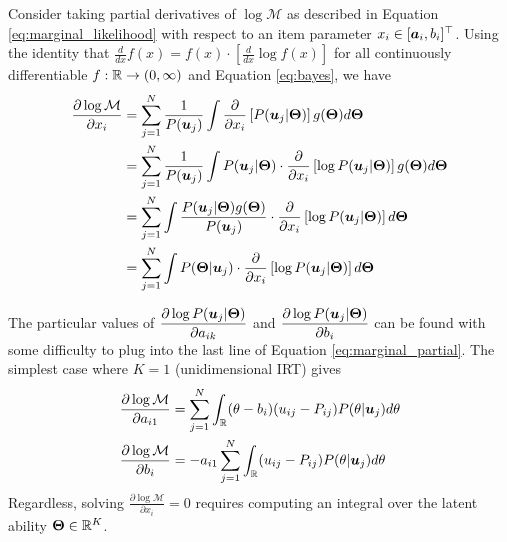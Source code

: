 Consider taking partial derivatives of $\log \mathcal{M}$ as described in Equation \ref{eq:marginal_likelihood} with respect to an item parameter $x_i \in [\boldsymbol{a}_i, b_i]^\top$. Using the identity that $\displaystyle\frac{d}{dx}f(x) = f(x) \cdot \left[\displaystyle\frac{d}{dx}\log f(x)\right]$ for all continuously differentiable $f:\mathbb{R} \to (0,\infty)$ and Equation \ref{eq:bayes}, we have 
\begin{equation}
\begin{split}
  \frac{\partial \log \mathcal{M}}{\partial x_i} &= \sum_{j=1}^N \frac{1}{P(\boldsymbol{u}_j)} \int \frac{\partial}{\partial x_i} \left[ P(\boldsymbol{u}_j | \boldsymbol{\Theta}) \right] g(\boldsymbol{\Theta}) d \boldsymbol{\Theta} \\
  &= \sum_{j=1}^N \frac{1}{P(\boldsymbol{u}_j)} \int P(\boldsymbol{u}_j | \boldsymbol{\Theta}) \cdot \frac{\partial}{\partial x_i}\left[\log P(\boldsymbol{u}_j | \boldsymbol{\Theta}) \right] g(\boldsymbol{\Theta}) d \boldsymbol{\Theta} \\
  &= \sum_{j=1}^N \int \frac{P(\boldsymbol{u}_j | \boldsymbol{\Theta})g(\boldsymbol{\Theta})}{P(\boldsymbol{u}_j)}  \cdot \frac{\partial}{\partial x_i}\left[\log P(\boldsymbol{u}_j | \boldsymbol{\Theta}) \right] d\boldsymbol{\Theta} \\
  &= \sum_{j=1}^N \int P(\boldsymbol{\Theta} | \boldsymbol{u}_j) \cdot \frac{\partial}{\partial x_i} \left[\log P(\boldsymbol{u}_j | \boldsymbol{\Theta}) \right] d \boldsymbol{\Theta}
\end{split}
  \label{eq:marginal_partial}
\end{equation}

The particular values of $\displaystyle\frac{\partial \log P(\boldsymbol{u}_j | \boldsymbol{\Theta})}{\partial a_{ik}}$ and $\displaystyle\frac{\partial \log P(\boldsymbol{u}_j | \boldsymbol{\Theta})}{\partial b_i}$ can be found with some difficulty \cite{baker_kim2004} to plug into the last line of Equation \ref{eq:marginal_partial}. The simplest case where $K=1$ (unidimensional IRT) gives
\begin{equation}
\begin{split}
  \frac{\partial \log \mathcal{M}}{\partial a_{i1}} &= \sum_{j=1}^N \int_\mathbb{R} (\theta - b_i)(u_{ij} - P_{ij}) P(\theta | \boldsymbol{u}_j) d \theta \\
  \frac{\partial \log \mathcal{M}}{\partial b_i} &= -a_{i1} \sum_{j=1}^N \int_\mathbb{R} (u_{ij} - P_{ij}) P(\theta | \boldsymbol{u}_j) d\theta
\end{split}
  \label{eq:unidim_marginal_partial}
\end{equation}
Regardless, solving $\displaystyle\frac{\partial \log \mathcal{M}}{\partial x_i} = 0$ requires computing an integral over the latent ability $\boldsymbol{\Theta} \in \mathbb{R}^K$.

